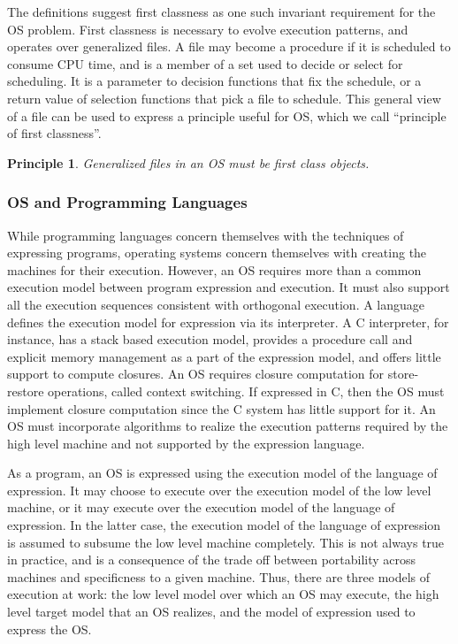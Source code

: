 \documentclass[draft]{article}
\newcounter{theprin}
\newtheorem{principle}[theprin]{Principle}
\begin{document}
The  definitions  suggest  first   classness  as  one  such  invariant
requirement  for the  OS  problem.  First  classness  is necessary  to
evolve  execution patterns,  and operates  over generalized  files.  A
file may  become a procedure if  it is scheduled to  consume CPU time,
and is a member of a set  used to decide or select for scheduling.  It
is  a parameter  to decision  functions that  fix the  schedule,  or a
return  value of  selection functions  that pick  a file  to schedule.
This general view of a file  can be used to express a principle useful
for OS, which we call ``principle of first classness''.
\begin{principle}
  \label{first:classness:principle}
  Generalized files in an OS must be first class objects.
\end{principle}

\subsubsection{OS and Programming Languages}
\label{sec:os:and:prog:lang}

While programming languages concern  themselves with the techniques of
expressing  programs,   operating  systems  concern   themselves  with
creating the  machines for their  execution.  However, an  OS requires
more  than a  common execution  model between  program  expression and
execution.   It   must  also  support  all   the  execution  sequences
consistent  with   orthogonal  execution.   A   language  defines  the
execution model for expression  via its interpreter.  A C interpreter,
for instance, has a stack  based execution model, provides a procedure
call and explicit memory management as a part of the expression model,
and offers little support to compute closures.  An OS requires closure
computation  for store-restore  operations, called  context switching.
If  expressed in  C, then  the OS  must implement  closure computation
since the C system has little  support for it.  An OS must incorporate
algorithms  to realize  the execution  patterns required  by  the high
level machine and not supported by the expression language.

As a  program, an  OS is  expressed using the  execution model  of the
language of expression.   It may choose to execute  over the execution
model of the  low level machine, or it may  execute over the execution
model  of  the  language  of  expression.  In  the  latter  case,  the
execution model  of the language  of expression is assumed  to subsume
the  low  level  machine  completely.   This is  not  always  true  in
practice,  and is a  consequence of  the trade off  between portability
across machines and specificness to  a given machine.  Thus, there are
three models of  execution at work: the low level  model over which an
OS may execute,  the high level target model that  an OS realizes, and
the model of expression used to express the OS.
\end{document}
